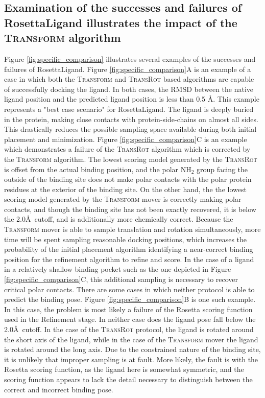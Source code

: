 \subsection{Examination of the successes and failures of RosettaLigand illustrates the impact of the \textsc{Transform} algorithm}
Figure \ref{fig:specific_comparison} illustrates several examples of the successes and failures of RosettaLigand.
Figure \ref{fig:specific_comparison}A is an example of a case in which both the \textsc{Transform} and \textsc{TransRot} based algorithms are capable of successfully docking the ligand.
In both cases, the RMSD between the native ligand position and the predicted ligand position is less than 0.5 \AA.  This example represents a "best case scenario" for RosettaLigand.
The ligand is deeply buried in the protein, making close contacts with protein-side-chains on almost all sides.
This drastically reduces the possible sampling space available during both initial placement and minimization.
Figure \ref{fig:specific_comparison}C is an example which demonstrates a failure of the \textsc{TransRot} algorithm which is corrected by the \textsc{Transform} algorithm.
The lowest scoring model generated by the \textsc{TransRot} is offset from the actual binding position, and the polar NH$_{2}$ group facing the outside of the binding site does not make polar contacts with the polar protein residues at the exterior of the binding site. 
On the other hand, the the lowest scoring model generated by the \textsc{Transform} mover is correctly making polar contacts, and though the binding site has not been exactly recovered, it is below the 2.0\AA\ cutoff, and is additionally more chemically correct.
Because the \textsc{Transform} mover is able to sample translation and rotation simultaneously, more time will be spent sampling reasonable docking positions, which increases the probability of the initial placement algorithm identifying a near-correct binding position for the refinement algorithm to refine and score.
In the case of a ligand in a relatively shallow binding pocket such as the one depicted in Figure \ref{fig:specific_comparison}C, this additional sampling is necessary to recover critical polar contacts. 
There are some cases in which neither protocol is able to predict the binding pose.
Figure \ref{fig:specific_comparison}B is one such example.  In this case, the problem is most likely a failure of the Rosetta scoring function used in the Refinement stage.
In neither case does the ligand pose fall below the 2.0\AA\ cutoff.  In the case of the \textsc{TransRot} protocol, the ligand is rotated around the short axis of the ligand, while in the case of the \textsc{Transform} mover the ligand is rotated around the long axis.
Due to the constrained nature of the binding site, it is unlikely that improper sampling is at fault.
More likely, the fault is with the Rosetta scoring function, as the ligand here is somewhat symmetric, and the scoring function appears to lack the detail necessary to distinguish between the correct and incorrect binding pose. 

